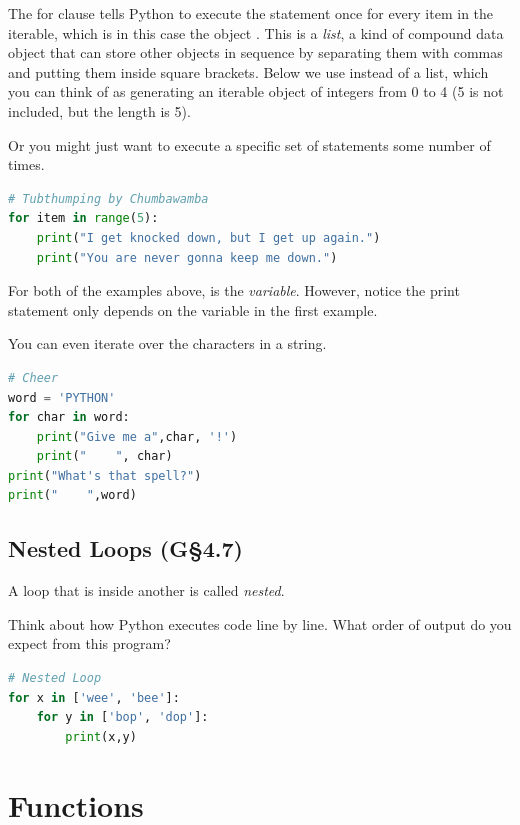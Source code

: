 The for clause tells Python to execute the statement once for every item in the iterable, which is in this case the object . This is a \emph{list}, a kind of 
compound data object that can store other objects in sequence by separating them with commas and putting them inside square brackets. Below we use  instead of a list, which you can think of as generating an iterable object of integers from 0 to 4 (5 is not included, but the length is 5).


\smallskip

Or you might just want to execute a specific set of statements some number of times.


\begin{lstlisting}[language = Python]
# Tubthumping by Chumbawamba
for item in range(5):
    print("I get knocked down, but I get up again.")
    print("You are never gonna keep me down.") \end{lstlisting}

\smallskip

For both of the examples above,  is the \emph{variable}. However, notice
the print statement only depends on the variable in the first example.

\smallskip
You can even iterate over the characters in a string.

\begin{lstlisting}[language = Python]
# Cheer
word = 'PYTHON'
for char in word:
    print("Give me a",char, '!')
    print("    ", char)
print("What's that spell?")
print("    ",word) \end{lstlisting}


\subsection{Nested Loops (G\S 4.7)}

A loop that is inside another is called \emph{nested}.

\smallskip
Think about how Python executes code line by line. What order of output do you expect from this program?


\begin{lstlisting}[language = Python]
# Nested Loop
for x in ['wee', 'bee']:
    for y in ['bop', 'dop']:
        print(x,y) \end{lstlisting}


\smallskip




\section{Functions}

